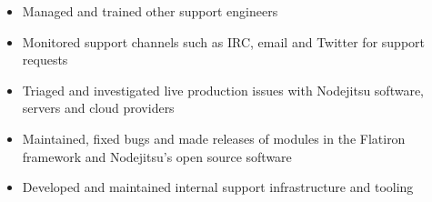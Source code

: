 \begin{itemize}
  \item Managed and trained other support engineers
  \item Monitored support channels such as IRC, email and Twitter for support
    requests
  \item Triaged and investigated live production issues with Nodejitsu software,
  servers and cloud providers
  \item Maintained, fixed bugs and made releases of modules in the Flatiron
    framework and Nodejitsu's open source software
  \item Developed and maintained internal support infrastructure and tooling
\end{itemize}
\normalsize
